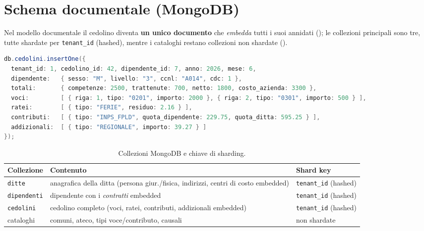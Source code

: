 \section{Schema documentale (MongoDB)}
\label{sec:logico-mongo}

Nel modello documentale il cedolino diventa \textbf{un unico documento} che \emph{embedda} tutti i suoi
annidati (); le collezioni principali sono tre, tutte shardate per \texttt{tenant\_id}
(hashed), mentre i cataloghi restano collezioni non shardate ().

\begin{lstlisting}[style=sobrio, language=Java, caption={Documento ``cedolino'': l'aggregato completo in un solo documento (embedding).}, label={lst:doc-cedolino}]
db.cedolini.insertOne({
  tenant_id: 1, cedolino_id: 42, dipendente_id: 7, anno: 2026, mese: 6,
  dipendente:   { sesso: "M", livello: "3", ccnl: "A014", cdc: 1 },
  totali:       { competenze: 2500, trattenute: 700, netto: 1800, costo_azienda: 3300 },
  voci:         [ { riga: 1, tipo: "0201", importo: 2000 }, { riga: 2, tipo: "0301", importo: 500 } ],
  ratei:        [ { tipo: "FERIE", residuo: 2.16 } ],
  contributi:   [ { tipo: "INPS_FPLD", quota_dipendente: 229.75, quota_ditta: 595.25 } ],
  addizionali:  [ { tipo: "REGIONALE", importo: 39.27 } ]
});
\end{lstlisting}

\begin{table}[htbp]
  \centering
  \caption{Collezioni MongoDB e chiave di sharding.}
  \label{tab:mongo-collezioni}
  \begin{tabularx}{\textwidth}{@{}lXl@{}}
    \toprule
    \textbf{Collezione} & \textbf{Contenuto} & \textbf{Shard key} \\
    \midrule
    \texttt{ditte}       & anagrafica della ditta (persona giur./fisica, indirizzi, centri di costo embedded) & \texttt{tenant\_id} (hashed) \\
    \texttt{dipendenti}  & dipendente con i \emph{contratti} embedded & \texttt{tenant\_id} (hashed) \\
    \texttt{cedolini}    & cedolino completo (voci, ratei, contributi, addizionali embedded) & \texttt{tenant\_id} (hashed) \\
    cataloghi            & comuni, ateco, tipi voce/contributo, causali & non shardate \\
    \bottomrule
  \end{tabularx}
\end{table}

